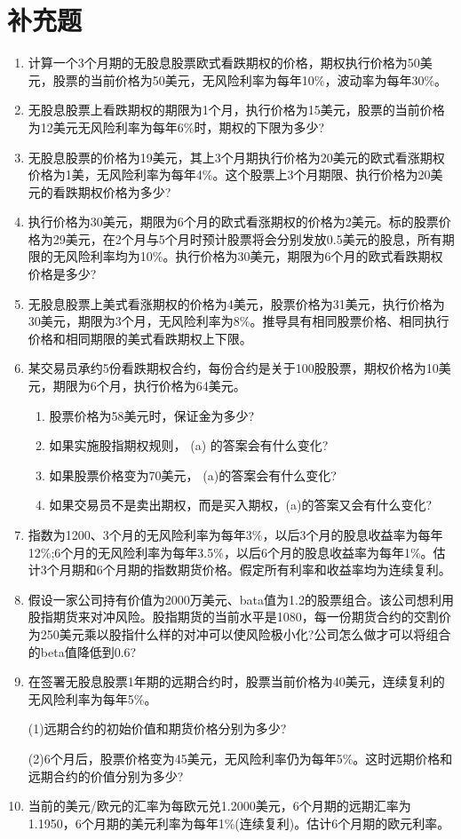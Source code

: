 \documentclass{article}
\begin{document}
\section{补充题}
\begin{enumerate}
    \item 计算一个3个月期的无股息股票欧式看跌期权的价格，期权执行价格为50美元，股票的当前价格为50美元，无风险利率为每年10\%，波动率为每年30\%。
    \item 无股息股票上看跌期权的期限为1个月，执行价格为15美元，股票的当前价格为12美元无风险利率为每年6\%时，期权的下限为多少?
    \item 无股息股票的价格为19美元，其上3个月期执行价格为20美元的欧式看涨期权价格为1美，无风险利率为每年4\%。这个股票上3个月期限、执行价格为20美元的看跌期权价格为多少?	
    \item 执行价格为30美元，期限为6个月的欧式看涨期权的价格为2美元。标的股票价格为29美元，在2个月与5个月时预计股票将会分别发放0.5美元的股息，所有期限的无风险利率均为10\%。执行价格为30美元，期限为6个月的欧式看跌期权价格是多少?
    \item 无股息股票上美式看涨期权的价格为4美元，股票价格为31美元，执行价格为30美元，期限为3个月，无风险利率为8\%。推导具有相同股票价格、相同执行价格和相同期限的美式看跌期权上下限。	
    \item 某交易员承约5份看跌期权合约，每份合约是关于100股股票，期权价格为10美元，期限为6个月，执行价格为64美元。
    \begin{enumerate}
        \item 股票价格为58美元时，保证金为多少?
        \item 如果实施股指期权规则， (a) 的答案会有什么变化?
        \item 如果股票价格变为70美元， (a)的答案会有什么变化?
        \item 如果交易员不是卖出期权，而是买入期权，(a)的答案又会有什么变化?
    \end{enumerate}
    \item 指数为1200、3个月的无风险利率为每年3\%，以后3个月的股息收益率为每年12\%;6个月的无风险利率为每年3.5\%，以后6个月的股息收益率为每年1\%。估计3个月期和6个月期的指数期货价格。假定所有利率和收益率均为连续复利。
    \item 假设一家公司持有价值为2000万美元、bata值为1.2的股票组合。该公司想利用股指期货来对冲风险。股指期货的当前水平是1080，每一份期货合约的交割价为250美元乘以股指什么样的对冲可以使风险极小化?公司怎么做才可以将组合的beta值降低到0.6?
    \item 在签署无股息股票1年期的远期合约时，股票当前价格为40美元，连续复利的无风险利率为每年5\%。
    
    (1)远期合约的初始价值和期货价格分别为多少?

    (2)6个月后，股票价格变为45美元，无风险利率仍为每年5\%。这时远期价格和远期合约的价值分别为多少?
    \item 当前的美元/欧元的汇率为每欧元兑1.2000美元，6个月期的远期汇率为1.1950，6个月期的美元利率为每年1\%(连续复利)。估计6个月期的欧元利率。
\end{enumerate}
\end{document}
